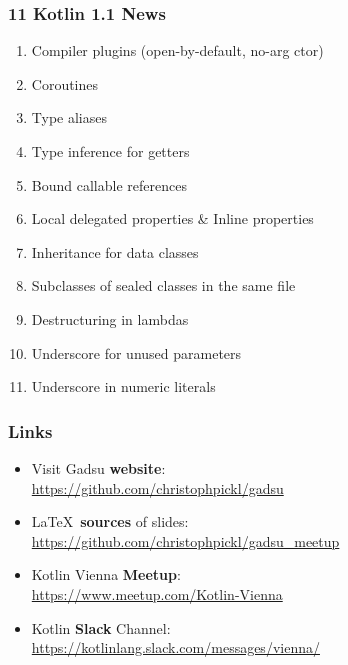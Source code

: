 \begin{frame}\frametitle{11 Kotlin 1.1 News}
\begin{enumerate}[<+->]
	\item {Compiler plugins (open-by-default, no-arg ctor)}
	\item {Coroutines}
	\item Type aliases
	\item Type inference for getters
	\item Bound callable references
	\item Local delegated properties \& Inline properties
	\item Inheritance for data classes
	\item Subclasses of sealed classes in the same file
	\item Destructuring in lambdas
	\item Underscore for unused parameters
	\item Underscore in numeric literals
\end{enumerate}
\end{frame}



\begin{frame}\frametitle{Links}

\begin{itemize}
	\item Visit Gadsu \textbf{website}: \\ \href{https://github.com/christophpickl/gadsu}{https://github.com/christophpickl/gadsu}
	\item \LaTeX~\textbf{sources} of slides: \\ \href{https://github.com/christophpickl/gadsu_meetup}{https://github.com/christophpickl/gadsu\_meetup}
	\item Kotlin Vienna \textbf{Meetup}: \\ \href{https://www.meetup.com/Kotlin-Vienna}{https://www.meetup.com/Kotlin-Vienna}
	\item Kotlin \textbf{Slack} Channel: \\ \href{https://kotlinlang.slack.com/messages/vienna/}{https://kotlinlang.slack.com/messages/vienna/}
\end{itemize}

\end{frame}




